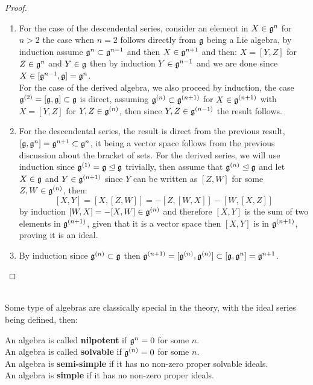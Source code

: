 \begin{proof}
	\begin{enumerate}[label=(\alph*)]
		\item For the case of the descendental series, consider an element in $X \in \mathfrak{g}^n$ for $n > 2$ the case when $n=2$ follows directly from $\mathfrak{g}$ being a Lie algebra, by induction assume $\mathfrak{g}^{n}\subset \mathfrak{g}^{n-1}$ and then $X \in \mathfrak{g}^{n+1}$ and then: $X=[Y,Z]$ for $Z \in \mathfrak{g}^{n}$ and $Y \in \mathfrak{g}$ then by induction $Y\in \mathfrak{g}^{n-1}$ and we are done since $X \in [\mathfrak{g}^{n-1},\mathfrak{g}] = \mathfrak{g}^{n}$.\\
		For the case of the derived algebra, we also proceed by induction, the case $\mathfrak{g}^{(2)} = [\mathfrak{g},\mathfrak{g}] \subset \mathfrak{g}$ is direct, assuming $\mathfrak{g}^{(n)} \subset \mathfrak{g}^{(n+1)}$ for $X \in \mathfrak{g}^{(n+1)}$ with $X=[Y,Z]$ for $Y,Z \in \mathfrak{g}^{(n)}$, then since $Y,Z \in \mathfrak{g}^{(n-1)}$ the result follows.\\
	\item For the descendental series, the result is direct from the previous result, $[\mathfrak{g},\mathfrak{g}^n] = \mathfrak{g}^{n+1} \subset \mathfrak{g}^n$, it being a vector space follows from the previous discussion about the bracket of sets. For the derived series, we will use induction since $\mathfrak{g}^{(1)}=\mathfrak{g} \trianglelefteq \mathfrak{g}$ trivially, then assume that $\mathfrak{g}^{(n)} \trianglelefteq \mathfrak{g}$ and let $X \in \mathfrak{g}$ and $Y \in \mathfrak{g}^{(n+1)}$ since $Y$ can be written as $[Z,W]$ for some $Z,W \in \mathfrak{g}^{(n)}$, then:
	$$[X,Y] = [X,[Z,W]] = -[Z,[W,X]]-[W,[X,Z]] $$ 
	by induction $[W,X] = -[X,W] \in \mathfrak{g}^{(n)}$ and therefore $[X,Y]$ is the sum of two elements in $\mathfrak{g}^{(n+1)}$, given that it is a vector space then $[X,Y]$ is in $\mathfrak{g}^{(n+1)}$, proving it is an ideal.
	\item By induction since $\mathfrak{g}^{(n)}\subset \mathfrak{g}$ then $\mathfrak{g}^{(n+1)} = [\mathfrak{g}^{(n)},\mathfrak{g}^{(n)}] \subset [\mathfrak{g},\mathfrak{g}^n] = \mathfrak{g}^{n+1}$.
	\end{enumerate}
\end{proof}\\
Some type of algebras are classically special in the theory, with the ideal series being defined, then:
\begin{defi}

 An algebra is called \textbf{nilpotent} if $\mathfrak{g}^n = 0$ for some $n$.\\
 An algebra is called \textbf{solvable} if $\mathfrak{g}^{(n)}=0$ for some $n$.\\
 An algebra is \textbf{semi-simple} if it has no non-zero proper solvable ideals.\\
 An algebra is \textbf{simple} if it has no non-zero proper ideals.

\label{algebratypes}
\end{defi}